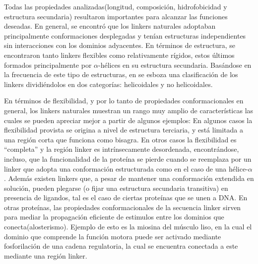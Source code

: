 Todas las propiedades analizadas(longitud, composición, hidrofobicidad y estructura secundaria) resultaron importantes para alcanzar las funciones deseadas.
En general, se encontró que los linkers naturales adoptaban principalmente conformaciones desplegadas y tenían estructuras independientes sin interacciones con los dominios adyacentes.
En términos de estructura, se encontraron tanto linkers flexibles como relativamente rígidos, estos últimos formados principalmente por $\alpha$-hélices en su estructura secundaria. 
Basándose en la frecuencia de este tipo de estructuras, en \cite{george2002analysis} se esboza una clasificación de los linkers dividiéndolos en dos categorías: helicoidales y no helicoidales.





En términos de flexibilidad, y por lo tanto de propiedades conformacionales en general, los linkers naturales muestran un rango muy amplio de características las cuales se pueden apreciar mejor a partir de algunos ejemplos:
En algunos casos la flexibilidad provista se origina a nivel de estructura terciaria, y está limitada a una región corta que funciona como bisagra.%
En otros casos la flexibilidad es ``completa'' y la región linker es intrínsecamente desordenada\cite{luo2010flexibility}, 
encontrándose, incluso, que la funcionalidad de la proteína se pierde cuando se reemplaza por un linker que adopta una conformación estructurada como en el caso de una hélice-$\alpha$ \cite{hrycyna1998structural}.
Además existen linkers que, a pesar de mantener una conformación extendida en solución, pueden plegarse (o fijar una estructura secundaria transitiva) en presencia de ligandos, 
tal es el caso de ciertas proteínas que se unen a DNA\cite{laity2000dna}.
En otras proteínas, las propiedades conformacionales de la secuencia linker sirven para mediar la propagación eficiente de estimulos entre los dominios que conecta(alosterismo).%
Ejemplo de esto es la miosina del músculo liso, en la cual el dominio que comprende la función motora puede ser activado mediante fosforilación de una cadena regulatoria, 
la cual se encuentra conectada a este mediante una región linker\cite{ikebe1998hinge}.

